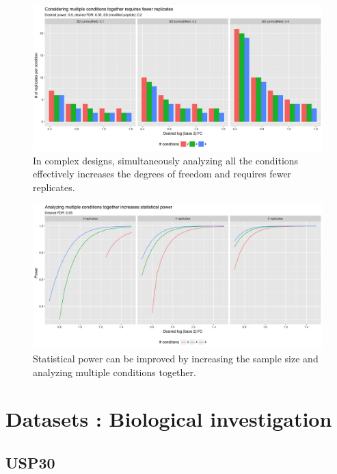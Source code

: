 \documentclass{mcp}
\begin{document}
\begin{figure}[h!]
\centering
\includegraphics[width=\textwidth]{sim/size_grp}
\caption{In complex designs, simultaneously analyzing all the conditions effectively increases the degrees of freedom and requires fewer replicates. \label{fig:size_grp}}
\end{figure}

\begin{figure}[h!]
\centering
\includegraphics[width=\textwidth]{sim/pwr_grp}
\caption{Statistical power can be improved by increasing the sample size and analyzing multiple conditions together. \label{fig:pwr_grp}}
\end{figure}


\clearpage
\section{Datasets : Biological investigation}

\subsection{USP30}
\end{document}

